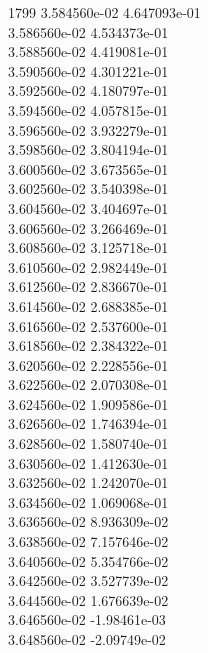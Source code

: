 1799	3.584560e-02	4.647093e-01	\\ 	3.586560e-02	4.534373e-01	\\ 	3.588560e-02	4.419081e-01	\\ 	3.590560e-02	4.301221e-01	\\ 	3.592560e-02	4.180797e-01	\\ 	3.594560e-02	4.057815e-01	\\ 	3.596560e-02	3.932279e-01	\\ 	3.598560e-02	3.804194e-01	\\ 	3.600560e-02	3.673565e-01	\\ 	3.602560e-02	3.540398e-01	\\ 	3.604560e-02	3.404697e-01	\\ 	3.606560e-02	3.266469e-01	\\ 	3.608560e-02	3.125718e-01	\\ 	3.610560e-02	2.982449e-01	\\ 	3.612560e-02	2.836670e-01	\\ 	3.614560e-02	2.688385e-01	\\ 	3.616560e-02	2.537600e-01	\\ 	3.618560e-02	2.384322e-01	\\ 	3.620560e-02	2.228556e-01	\\ 	3.622560e-02	2.070308e-01	\\ 	3.624560e-02	1.909586e-01	\\ 	3.626560e-02	1.746394e-01	\\ 	3.628560e-02	1.580740e-01	\\ 	3.630560e-02	1.412630e-01	\\ 	3.632560e-02	1.242070e-01	\\ 	3.634560e-02	1.069068e-01	\\ 	3.636560e-02	8.936309e-02	\\ 	3.638560e-02	7.157646e-02	\\ 	3.640560e-02	5.354766e-02	\\ 	3.642560e-02	3.527739e-02	\\ 	3.644560e-02	1.676639e-02	\\ 	3.646560e-02	-1.98461e-03	\\ 	3.648560e-02	-2.09749e-02	\\ \hline
